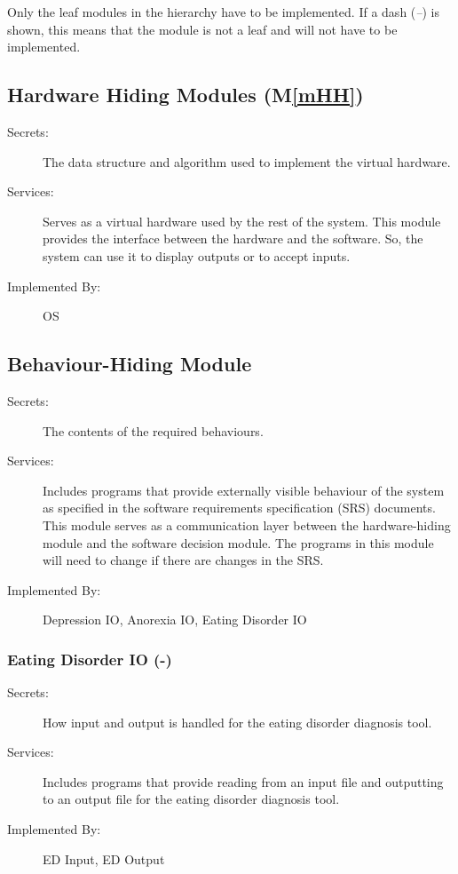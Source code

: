 \documentclass[12pt, titlepage]{article}
\newcommand{\mref}[1]{M\ref{#1}}
\begin{document}
Only the leaf modules in the hierarchy have to be implemented. If a dash
(\emph{--}) is shown, this means that the module is not a leaf and will not have
to be implemented.

\subsection{Hardware Hiding Modules (\mref{mHH})}

\begin{description}
\item[Secrets:]The data structure and algorithm used to implement the virtual
  hardware.
\item[Services:]Serves as a virtual hardware used by the rest of the
  system. This module provides the interface between the hardware and the
  software. So, the system can use it to display outputs or to accept inputs.
\item[Implemented By:] OS
\end{description}

\subsection{Behaviour-Hiding Module}

\begin{description}
\item[Secrets:]The contents of the required behaviours.
\item[Services:]Includes programs that provide externally visible behaviour of
  the system as specified in the software requirements specification (SRS)
  documents. This module serves as a communication layer between the
  hardware-hiding module and the software decision module. The programs in this
  module will need to change if there are changes in the SRS.
\item[Implemented By:] Depression IO, Anorexia IO, Eating Disorder IO
\end{description}

\subsubsection{Eating Disorder IO (-)}
\begin{description}
\item[Secrets:]How input and output is handled for the eating disorder diagnosis tool.
\item[Services:]Includes programs that provide reading from an input file and outputting to an output file for the eating disorder diagnosis tool.
\item[Implemented By:] ED Input, ED Output
\end{description}
\end{document}
